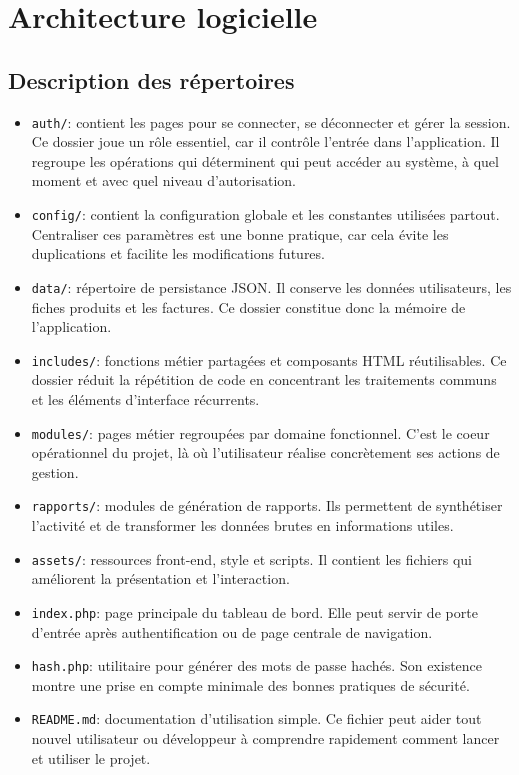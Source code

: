 \documentclass[12pt,a4paper]{article}
\begin{document}
\section{Architecture logicielle}
\subsection{Description des répertoires}
\begin{itemize}
  \item \texttt{auth/}: contient les pages pour se connecter, se déconnecter et gérer la session. Ce dossier joue un rôle essentiel, car il contrôle l'entrée dans l'application. Il regroupe les opérations qui déterminent qui peut accéder au système, à quel moment et avec quel niveau d'autorisation.
  \item \texttt{config/}: contient la configuration globale et les constantes utilisées partout. Centraliser ces paramètres est une bonne pratique, car cela évite les duplications et facilite les modifications futures.
  \item \texttt{data/}: répertoire de persistance JSON. Il conserve les données utilisateurs, les fiches produits et les factures. Ce dossier constitue donc la mémoire de l'application.
  \item \texttt{includes/}: fonctions métier partagées et composants HTML réutilisables. Ce dossier réduit la répétition de code en concentrant les traitements communs et les éléments d'interface récurrents.
  \item \texttt{modules/}: pages métier regroupées par domaine fonctionnel. C'est le coeur opérationnel du projet, là où l'utilisateur réalise concrètement ses actions de gestion.
  \item \texttt{rapports/}: modules de génération de rapports. Ils permettent de synthétiser l'activité et de transformer les données brutes en informations utiles.
  \item \texttt{assets/}: ressources front-end, style et scripts. Il contient les fichiers qui améliorent la présentation et l'interaction.
  \item \texttt{index.php}: page principale du tableau de bord. Elle peut servir de porte d'entrée après authentification ou de page centrale de navigation.
  \item \texttt{hash.php}: utilitaire pour générer des mots de passe hachés. Son existence montre une prise en compte minimale des bonnes pratiques de sécurité.
  \item \texttt{README.md}: documentation d'utilisation simple. Ce fichier peut aider tout nouvel utilisateur ou développeur à comprendre rapidement comment lancer et utiliser le projet.

\end{itemize}
\end{document}
